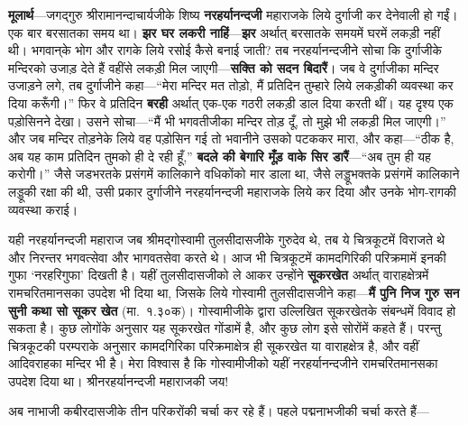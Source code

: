 \begin{sloppypar}\justifying{}
\textbf{मूलार्थ}—जगद्गुरु श्रीरामानन्दाचार्यजीके शिष्य \textbf{नरहर्यानन्दजी} महाराजके लिये दुर्गाजी कर देनेवाली हो गईं। एक बार बरसातका समय था। \textbf{झर घर लकरी नाहिं}—\textbf{झर} अर्थात् बरसातके समयमें घरमें लकड़ी नहीं थी। भगवान्‌के भोग और रागके लिये रसोई कैसे बनाई जाती? तब नरहर्यानन्दजीने सोचा कि दुर्गाजीके मन्दिरको उजाड़ देते हैं वहींसे लकड़ी मिल जाएगी—\textbf{सक्ति को सदन बिदारैं}। जब वे दुर्गाजीका मन्दिर उजाड़ने लगे, तब दुर्गाजीने कहा—“मेरा मन्दिर मत तोड़ो, मैं प्रतिदिन तुम्हारे लिये लकड़ीकी व्यवस्था कर दिया करूँगी।” फिर वे प्रतिदिन \textbf{बरही} अर्थात् एक-एक गठरी लकड़ी डाल दिया करती थीं। यह दृश्य एक पड़ोसिनने देखा। उसने सोचा—“मैं भी भगवतीजीका मन्दिर तोड़ दूँ, तो मुझे भी लकड़ी मिल जाएगी।” और जब मन्दिर तोड़नेके लिये वह पड़ोसिन गई तो भवानीने उसको पटककर मारा, और कहा—“ठीक है, अब यह काम प्रतिदिन तुमको ही दे रही हूँ,” \textbf{बदले की बेगारि मूँड़ वाके सिर डारैं}—“अब तुम ही यह करोगी।” जैसे जडभरतके प्रसंगमें कालिकाने वधिकोंको मार डाला था, जैसे लड्डूभक्तके प्रसंगमें कालिकाने लड्डूकी रक्षा की थी, उसी प्रकार दुर्गाजीने नरहर्यानन्दजी महाराजके लिये कर दिया और उनके भोग-रागकी व्यवस्था कराई।
\end{sloppypar}
\begin{sloppypar}\justifying{}
यही नरहर्यानन्दजी महाराज जब श्रीमद्गोस्वामी तुलसीदासजीके गुरुदेव थे, तब ये चित्रकूटमें विराजते थे और निरन्तर भगवत्सेवा और भागवतसेवा करते थे। आज भी चित्रकूटमें कामदगिरिकी परिक्रमामें इनकी गुफा ‘नरहरिगुफा’ दिखती है। यहीं तुलसीदासजीको ले आकर उन्होंने \textbf{सूकरखेत} अर्थात् वाराहक्षेत्रमें रामचरितमानसका उपदेश भी दिया था, जिसके लिये गोस्वामी तुलसीदासजीने कहा—\textbf{मैं पुनि निज गुरु सन सुनी कथा सो सूकर खेत} (मा.~१.३०क)। गोस्वामीजीके द्वारा उल्लिखित सूकरखेतके संबन्धमें विवाद हो सकता है। कुछ लोगोंके अनुसार यह सूकरखेत गोंडामें है, और कुछ लोग इसे सोरोंमें कहते हैं। परन्तु चित्रकूटकी परम्पराके अनुसार कामदगिरिका परिक्रमा\-क्षेत्र ही सूकरखेत या वाराहक्षेत्र है, और वहीं आदिवराहका मन्दिर भी है। मेरा विश्वास है कि गोस्वामीजीको यहीं नरहर्यानन्दजीने रामचरितमानसका उपदेश दिया था। श्रीनरहर्यानन्दजी महाराजकी जय!
\end{sloppypar}
\begin{sloppypar}\justifying{}
अब नाभाजी कबीरदासजीके तीन परिकरोंकी चर्चा कर रहे हैं। पहले पद्मनाभजीकी चर्चा करते हैं—
\end{sloppypar}


